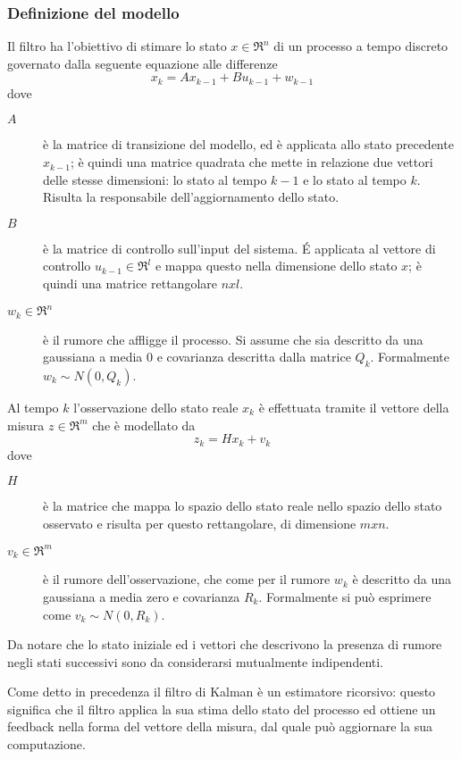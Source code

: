 \subsubsection{Definizione del modello}\label{modelKalman}
Il filtro ha l'obiettivo di stimare lo stato $x \in \Re^n$ di un processo a tempo discreto governato dalla seguente equazione alle differenze
\begin{equation}\label{eq:x}
 x_k=Ax_{k-1}+Bu_{k-1}+w_{k-1}
\end{equation} 
dove 
\begin{description}
 \item [$A$] è la matrice di transizione del modello, ed è applicata allo stato precedente $x_{k-1}$; è quindi una matrice quadrata che mette in relazione due vettori delle stesse dimensioni: lo stato al tempo $k-1$ e lo stato al tempo $k$. Risulta la responsabile dell'aggiornamento dello stato.
\item [$B$] è la matrice di controllo sull'input del sistema. \'E applicata al vettore di controllo $u_{k-1} \in \Re^l$ e mappa questo nella dimensione dello stato $x$; è quindi una matrice rettangolare $nxl$.
\item [$w_k \in \Re^n$] è il rumore che affligge il processo. Si assume che sia descritto da una gaussiana a media $0$ e covarianza descritta dalla matrice $Q_k$. Formalmente $w_k \sim N(0,Q_k)$.
\end{description}

Al tempo $k$ l'osservazione dello stato reale $x_k$ è effettuata tramite il vettore della misura $z \in \Re^m$ che è modellato da
\begin{equation}\label{eq:z}
z_k=Hx_k+v_k
\end{equation}
dove 
\begin{description}
 \item [$H$] è la matrice che mappa lo spazio dello stato reale nello spazio dello stato osservato e risulta per questo rettangolare, di dimensione $mxn$.
\item [$v_k \in \Re^m$] è il rumore dell'osservazione, che come per il rumore $w_k$ è descritto da una gaussiana a media zero e covarianza $R_k$. Formalmente si può esprimere come $v_k \sim N(0,R_k)$.
\end{description}
 Da notare che lo stato iniziale ed i vettori che descrivono la presenza di rumore negli stati successivi sono da considerarsi mutualmente indipendenti.

Come detto in precedenza il filtro di Kalman è un estimatore ricorsivo: questo significa che il filtro applica la sua stima dello stato del processo ed ottiene un feedback nella forma del vettore della misura, dal quale può aggiornare la sua computazione. 

